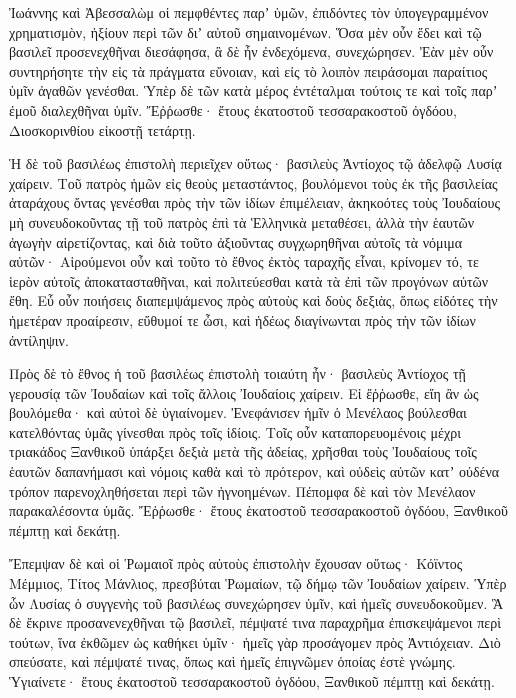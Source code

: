 {Ἰωάννης καὶ Ἀβεσσαλὼμ οἱ πεμφθέντες παρʼ ὑμῶν, ἐπιδόντες τὸν ὑπογεγραμμένον χρηματισμὸν, ἠξίουν περὶ τῶν διʼ αὐτοῦ σημαινομένων.
Ὅσα μὲν οὖν ἔδει καὶ τῷ βασιλεῖ προσενεχθῆναι διεσάφησα, ἃ δὲ ἦν ἐνδεχόμενα, συνεχώρησεν.
Ἐὰν μὲν οὖν συντηρήσητε τὴν εἰς τὰ πράγματα εὔνοιαν, καὶ εἰς τὸ λοιπὸν πειράσομαι παραίτιος ὑμῖν ἀγαθῶν γενέσθαι.
Ὑπὲρ δὲ τῶν κατὰ μέρος ἐντέταλμαι τούτοις τε καὶ τοῖς παρʼ ἐμοῦ διαλεχθῆναι ὑμῖν.
Ἔῤῥωσθε· ἔτους ἑκατοστοῦ τεσσαρακοστοῦ ὀγδόου, Διοσκορινθίου εἰκοστῇ τετάρτῃ.
\par }{\PP {}Ἡ δὲ τοῦ βασιλέως ἐπιστολὴ περιεῖχεν οὕτως· βασιλεὺς Ἀντίοχος τῷ ἀδελφῷ Λυσίᾳ χαίρειν.
Τοῦ πατρὸς ἡμῶν εἰς θεοὺς μεταστάντος, βουλόμενοι τοὺς ἐκ τῆς βασιλείας ἀταράχους ὄντας γενέσθαι πρὸς τὴν τῶν ἰδίων ἐπιμέλειαν,
ἀκηκοότες τοὺς Ἰουδαίους μὴ συνευδοκοῦντας τῇ τοῦ πατρὸς ἐπὶ τὰ Ἑλληνικὰ μεταθέσει, ἀλλὰ τὴν ἑαυτῶν ἀγωγὴν αἱρετίζοντας, καὶ διὰ τοῦτο ἀξιοῦντας συγχωρηθῆναι αὐτοῖς τὰ νόμιμα αὐτῶν·
Αἱρούμενοι οὖν καὶ τοῦτο τὸ ἔθνος ἐκτὸς ταραχῆς εἶναι, κρίνομεν τό, τε ἱερὸν αὐτοῖς ἀποκατασταθῆναι, καὶ πολιτεύεσθαι κατὰ τὰ ἐπὶ τῶν προγόνων αὐτῶν ἔθη.
Εὖ οὖν ποιήσεις διαπεμψάμενος πρὸς αὐτοὺς καὶ δοὺς δεξιὰς, ὅπως εἰδότες τὴν ἡμετέραν προαίρεσιν, εὔθυμοί τε ὦσι, καὶ ἡδέως διαγίνωνται πρὸς τὴν τῶν ἰδίων ἀντίληψιν.
\par }{\PP {}Πρὸς δὲ τὸ ἔθνος ἡ τοῦ βασιλέως ἐπιστολὴ τοιαύτη ἦν· βασιλεὺς Ἀντίοχος τῇ γερουσίᾳ τῶν Ἰουδαίων καὶ τοῖς ἄλλοις Ἰουδαίοις χαίρειν.
Εἰ ἔῤῥωσθε, εἴη ἂν ὡς βουλόμεθα· καὶ αὐτοὶ δὲ ὑγιαίνομεν.
Ἐνεφάνισεν ἡμῖν ὁ Μενέλαος βούλεσθαι κατελθόντας ὑμᾶς γίνεσθαι πρὸς τοῖς ἰδίοις.
Τοῖς οὖν καταπορευομένοις μέχρι τριακάδος Ξανθικοῦ ὑπάρξει δεξιὰ μετὰ τῆς ἀδείας,
χρῆσθαι τοὺς Ἰουδαίους τοῖς ἑαυτῶν δαπανήμασι καὶ νόμοις καθὰ καὶ τὸ πρότερον, καὶ οὐδεὶς αὐτῶν κατʼ οὐδένα τρόπον παρενοχληθήσεται περὶ τῶν ἠγνοημένων.
Πέπομφα δὲ καὶ τὸν Μενέλαον παρακαλέσοντα ὑμᾶς.
Ἔῤῥωσθε· ἔτους ἑκατοστοῦ τεσσαρακοστοῦ ὀγδόου, Ξανθικοῦ πέμπτῃ καὶ δεκάτῃ.
\par }{\PP {}Ἔπεμψαν δὲ καὶ οἱ Ῥωμαιοῖ πρὸς αὐτοὺς ἐπιστολὴν ἔχουσαν οὕτως· Κόϊντος Μέμμιος, Τίτος Μάνλιος, πρεσβύται Ῥωμαίων, τῷ δήμῳ τῶν Ἰουδαίων χαίρειν.
Ὑπὲρ ὧν Λυσίας ὁ συγγενὴς τοῦ βασιλέως συνεχώρησεν ὑμῖν, καὶ ἡμεῖς συνευδοκοῦμεν.
Ἃ δὲ ἔκρινε προσανενεχθῆναι τῷ βασιλεῖ, πέμψατέ τινα παραχρῆμα ἐπισκεψάμενοι περὶ τούτων, ἵνα ἐκθῶμεν ὡς καθήκει ὑμῖν· ἡμεῖς γὰρ προσάγομεν πρὸς Ἀντιόχειαν.
Διὸ σπεύσατε, καὶ πέμψατέ τινας, ὅπως καὶ ἡμεῖς ἐπιγνῶμεν ὁποίας ἐστὲ γνώμης.
Ὑγιαίνετε· ἔτους ἑκατοστοῦ τεσσαρακοστοῦ ὀγδόου, Ξανθικοῦ πέμπτῃ καὶ δεκάτῃ.

}

